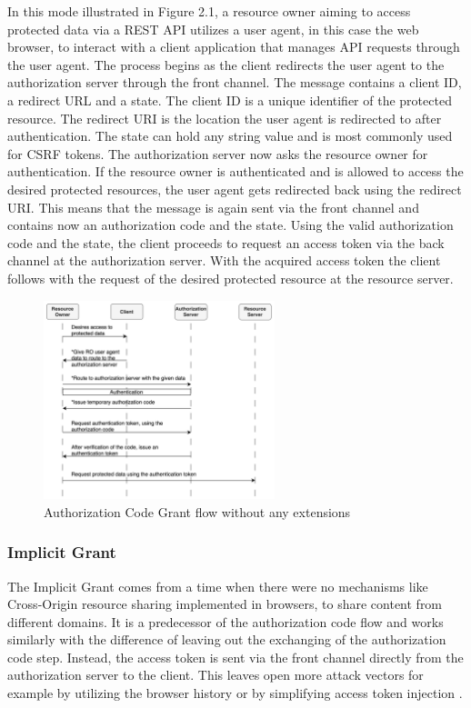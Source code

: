 \documentclass[
    fontsize=12pt,
    headings=small,
    parskip=half,           %
    bibliography=totoc,
    numbers=noenddot,       %
    open=any,               %
    ]{scrreprt}
\begin{document}
In this mode illustrated in Figure 2.1, a resource owner aiming to access
protected data via a REST API utilizes a user agent, in this case the web
browser, to interact with a client application that manages API requests
through the user agent. The process begins as the client redirects the user
agent to the authorization server through the front channel. The message
contains a client ID, a redirect URL and a state. The client ID is a unique
identifier of the protected resource. The redirect URI is the location the user
agent is redirected to after authentication. The state can hold any string
value and is most commonly used for CSRF tokens. The authorization server now
asks the resource owner for authentication. If the resource owner is
authenticated and is allowed to access the desired protected resources, the
user agent gets redirected back using the redirect URI. This means that the
message is again sent via the front channel and contains now an authorization
code and the state. Using the valid authorization code and the state, the
client proceeds to request an access token via the back channel at the
authorization server. With the acquired access token the client follows with
the request of the desired protected resource at the resource server.

\begin{figure}[ht]
	\sffamily\footnotesize
	\includegraphics[width=0.6\textwidth]{pic/authorization_code_grant.png}
	\unitlength=0.75mm
	\linethickness{0.4pt}
	\caption{Authorization Code Grant flow without any extensions}
	\label{fig:auth_code_grant}
\end{figure}

\subsubsection{Implicit Grant}
The Implicit Grant comes from a time when there were no mechanisms like
Cross-Origin resource sharing implemented in browsers, to share content from
different domains. It is a predecessor of the authorization code flow and works
similarly with the difference of leaving out the exchanging of the
authorization code step. Instead, the access token is sent via the front
channel directly from the authorization server to the client. This leaves open
more attack vectors for example by utilizing the browser history or by
simplifying access token injection \cite{lodderstedt2020oauth}.
\end{document}
